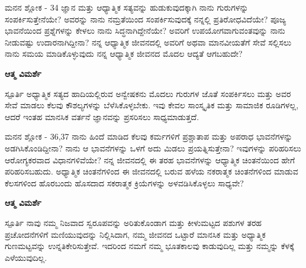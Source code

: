 \begin{mananam}{\mananamfont ಮನನ ಶ್ಲೋಕ - \textenglish{34}}
\footnotesize \mananamtext ಜ್ಞಾನ ಮತ್ತು ಆಧ್ಯಾತ್ಮಿಕ ಸತ್ಯವನ್ನು ಹುಡುಕುವುದಕ್ಕಾಗಿ ನಾನು ಗುರುಗಳನ್ನು ಸಂಪರ್ಕಿಸುತ್ತೇನೆಯೇ? ಅವರನ್ನು ನಾನು ನಮ್ರತೆಯಿಂದ ಸಂಪರ್ಕಿಸುವುದಕ್ಕೆ ನನ್ನಲ್ಲಿ ಪ್ರತಿರೋಧವಿದೆಯೇ? ಪೂಜ್ಯ ಭಾವನೆಯಿಂದ ಪ್ರಶ್ನೆಗಳನ್ನು ಕೇಳಲು ನಾನು ಸಿದ್ಧನಾಗಿದ್ದೇನೆಯೇ? ಅವರಿಗೆ ಉಪಯೋಗವಾಗುವಂತವುನ್ನು ನಾನು ನೀಡುವಷ್ಟು ಉದಾರನಾಗಿದ್ದೀನಾ? ನನ್ನ ಆಧ್ಯಾತ್ಮಿಕ ಜೀವನದಲ್ಲಿ ಅವರಿಗೆ ಅಥವಾ ಮಾನವೀಯತೆಗೆ ಸೇವೆ ಸಲ್ಲಿಸಲು ನಾನು ಸಮಯ ಮಾಡಿಕೊಳ್ಳುವುದು ನನ್ನ ಆಧ್ಯಾತ್ಮಿಕ ಜೀವನದ ಮೊದಲ ಆದ್ಯತೆ ಆಗಬಹುದೇ?
\end{mananam}
\WritingHand\enspace\textbf{ಆತ್ಮ ವಿಮರ್ಶೆ}\\
\begin{inspiration}{\mananamfont ಸ್ಪೂರ್ತಿ}
\footnotesize \mananamtext ಅಧ್ಯಾತ್ಮಿಕ ಸತ್ಯದ ಹಾದಿಯಲ್ಲಿರುವ ಅನ್ವೇಷಕನು ಮೊದಲು ಗುರುಗಳ ಜೊತೆ ಸಂಪರ್ಕಿಸಲು ಮತ್ತು ಅವರ ಸೇವೆ ಮಾಡಲು ಕೆಲವು ಕೌಶಲ್ಯಗಳನ್ನು ಬೆಳೆಸಿಕೊಳ್ಳಬೇಕು. ಇವು ಕೇವಲ ಸಾಂಸ್ಕೃತಿಕ ಮತ್ತು ಸಾಮಾಜಿಕ ರೂಡಿಗಳಲ್ಲ, ಆದರೆ ಇಂತಹ ಮಾನಸಿಕ ವರ್ತನೆ ಜ್ಞಾನವನ್ನು ಪ್ರಸರಿಸಲು ಸಾಧ್ಯಮಾಡುತ್ತದೆ.
\end{inspiration}

\newpage
\begin{mananam}{\mananamfont ಮನನ ಶ್ಲೋಕ - \textenglish{36,37}}
\footnotesize \mananamtext ನಾನು ಹಿಂದೆ ಮಾಡಿದ ಕೆಲವು ಕರ್ಮಗಳಿಗೆ ಪ್ರಶ್ಚಾತಾಪ  ಮತ್ತು ಅಪರಾಧ ಭಾವನೆಗಳನ್ನು ಅಡಗಿಸಿಕೊಂಡಿದ್ದೀನಾ? ನಾನು ಆ ಭಾವನೆಗಳನ್ನು ಒಳಗೆ ಅದು ಮಿಡಲು ಪ್ರಯತ್ನಿಸುತ್ತೇನಾ? ಇವುಗಳನ್ನು ಪರಿಹರಿಸಲು ಆರೋಗ್ಯಕರವಾದ ವಿಧಾನಗಳಿವೆಯೇ? ನನ್ನ ಜೀವನದಲ್ಲಿ ಈ ತರಹ ಭಾವನೆಗಳನ್ನು ಆಧ್ಯಾತ್ಮಿಕ ಚಿಂತನೆಯಿಂದ ಹೇಗೆ ಪರಿಹರಿಸಬಹುದು. ಅಧ್ಯಾತ್ಮಿಕ ಚಿಂತನೆಗಳಿಂದ ಈ ಜೀವನದಲ್ಲಿ ಬರುವ ಹಳೆಯ ನಕರಾತ್ಮಕ ಚಿಂತನೆಗಳಿಂದ ಮಾಡುವ ಕೆಲಸಗಳಿಂದ ಹೊರಬಂದು ಹೊಸದಾದ ಸಕರಾತ್ಮಕ ಕ್ರಿಯೆಗಳನ್ನು ಅಳವಡಿಸಿಕೊಳ್ಳಲು ಸಾಧ್ಯವೇ?\\
\end{mananam}
\WritingHand\enspace\textbf{ಆತ್ಮ ವಿಮರ್ಶೆ}\\
\begin{inspiration}{\mananamfont ಸ್ಪೂರ್ತಿ}
\footnotesize \mananamtext ನಾವು ನಮ್ಮ ನಿಜವಾದ ಸ್ವರೂಪವನ್ನು ಅರಿತುಕೊಂಡಾಗ ಮತ್ತು ಕೀಳುಮಟ್ಟದ ಪಶುಗಳ ತರಹ ಪ್ರಚೋದನೆಗಳಿಗೆ ಮಣಿಯುವುದನ್ನು ನಿಲ್ಲಿಸಿದಾಗ, ನಮ್ಮ ಜೀವನದ ಒಟ್ಟಾರೆ ಮಾನಸಿಕ ಮತ್ತು ಅಧ್ಯಾತ್ಮಿಕ ಗುಣಮಟ್ಟವನ್ನು ಉನ್ನತಿಕೇರಿಸುತ್ತೇವೆ. ಇದರಿಂದ ನಮಗೆ ನಮ್ಮ ಭೂತಕಾಲವು ಕಾಡುವುದಿಲ್ಲ ಮತ್ತು ನಮ್ಮನ್ನು ಕೆಳಕ್ಕೆ ಎಳೆಯುವುದಿಲ್ಲ.
\end{inspiration}
\newpage

